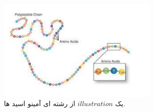 \documentclass[12pt]{article}
\begin{document}
\begin{figure}[htbp]
    \centering
    \includegraphics[width=0.7\textwidth]{etc/Images/Fig4.png}
    \caption{یک $illustration$ از رشته ای آمینو اسید ها.}
    \label{Fig4}
\end{figure}
\end{document}
